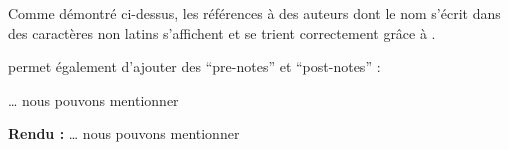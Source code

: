 Comme démontré ci-dessus, les références à des auteurs dont le nom s'écrit dans des caractères non latins s'affichent et se
trient correctement grâce à .

 permet également d'ajouter des \enquote{pre-notes} et \enquote{post-notes} :
\begin{latexcode}
\dots{} nous pouvons mentionner \textcite[originalement du 9ème siècle,][qui traduit Aristote]{aljahiz}
\end{latexcode}

\noindent \textbf{Rendu :} \dots{} nous pouvons mentionner \textcite[originalement du 9ème siècle,][qui traduit Aristote]{aljahiz}